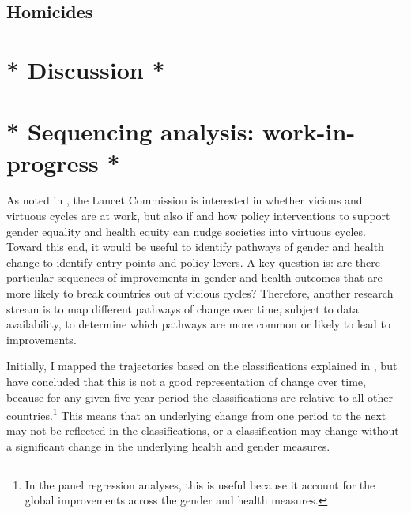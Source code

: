 \documentclass[12pt]{article}
\begin{document}
\subsection*{Homicides}

\section{* Discussion *}
\label{discussion}


\section{* Sequencing analysis: work-in-progress *}
\label{sequencing}

As noted in , the Lancet Commission is interested in whether vicious and virtuous cycles are at work, but also if and how policy interventions to support gender equality and health equity can nudge societies into virtuous cycles. Toward this end, it would be useful to identify pathways of gender and health change to identify entry points and policy levers. A key question is: are there particular sequences of improvements in gender and health outcomes that are more likely to break countries out of vicious cycles? Therefore, another research stream is to map different pathways of change over time, subject to data availability, to determine which pathways are more common or likely to lead to improvements.

Initially, I mapped the trajectories based on the classifications explained in , but have concluded that this is not a good representation of change over time, because for any given five-year period the classifications are relative to all other countries.\footnote{In the panel regression analyses, this is useful because it account for the global  improvements across the gender and health measures.} This means that an underlying change from one period to the next may not be reflected in the classifications, or a classification may change without a significant change in the underlying health and gender measures.
\end{document}

